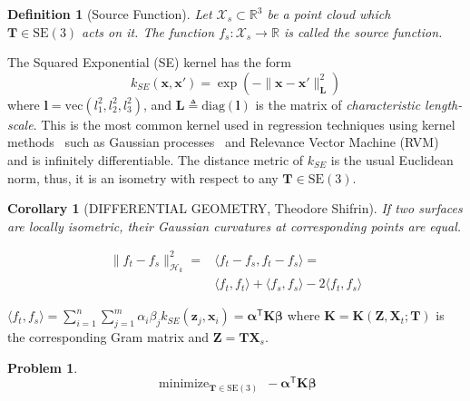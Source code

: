 \documentclass[conference]{IEEEtran}
\newtheorem{problem}{Problem}
\newtheorem{corollary}[theorem]{Corollary}
\newtheorem{definition}{Definition}
\newcommand{\Hcal}{\mathcal{H}}
\newcommand{\Xcal}{\mathcal{X}}
\DeclareMathOperator*{\minimize}{minimize}
\newcommand{\transpose}{\mathsf{T}}
\newcommand{\SE}{\mathrm{SE}}
\begin{document}
\begin{definition}[Source Function]
 Let $\Xcal_s \subset \mathbb{R}^3$ be a point cloud which $\mathbf{T} \in \mathrm{SE}(3)$ acts on it. The function \mbox{$f_s:\Xcal_s \to \mathbb{R}$} is called the source function.
\end{definition}

The Squared Exponential (SE) kernel has the form
\begin{equation}
\label{eq:SEcov}
k_{SE}(\mathbf{x},\mathbf{x}') = \exp(-\lVert \mathbf{x} - \mathbf{x}' \rVert^2_{\mathbf{L}})
\end{equation}
where $\mathbf{l} = \mathrm{vec}(l_1^2, l_2^2, l_3^2)$, and $\mathbf{L} \triangleq \mathrm{diag}(\mathbf{l})$ is the matrix of \emph{characteristic length-scale}. This is the most common kernel used in regression techniques using kernel methods~\citep{scholkopf2002learning} such as Gaussian processes~\citep{rasmussen2006gaussian} and Relevance Vector Machine (RVM)~\citep{tipping2001sparse} and is infinitely differentiable. The distance metric of $k_{SE}$ is the usual Euclidean norm, thus, it is an isometry with respect to any $\mathbf{T} \in \SE(3)$.

\begin{corollary}[DIFFERENTIAL GEOMETRY, Theodore Shifrin]
 If two surfaces are locally isometric, their Gaussian curvatures at corresponding points are equal.
\end{corollary}


\begin{align}
	\nonumber \lVert f_t - f_s \rVert^2_{\Hcal_k} = &\langle f_t - f_s, f_t - f_s \rangle = \\
    &\langle f_t, f_t \rangle + \langle f_s, f_s \rangle -2 \langle f_t, f_s \rangle
\end{align}

$\langle f_t, f_s \rangle = \sum_{i=1}^n \sum_{j=1}^m \alpha_i \beta_j k_{SE}(\mathbf{z}_j, \mathbf{x}_i) = \boldsymbol \alpha^\transpose \mathbf{K} \boldsymbol \beta$ where $\mathbf{K} = \mathbf{K}(\mathbf{Z}, \mathbf{X}_t; \mathbf{T})$ is the corresponding Gram matrix and \mbox{$\mathbf{Z} = \mathbf{T} \mathbf{X}_s$}.

\begin{problem}
\label{prob:min}
\begin{equation}
	\nonumber \minimize_{\mathbf{T} \in \SE(3)} \ -\boldsymbol \alpha^\transpose \mathbf{K} \boldsymbol \beta
\end{equation}
\end{problem}
\end{document}
